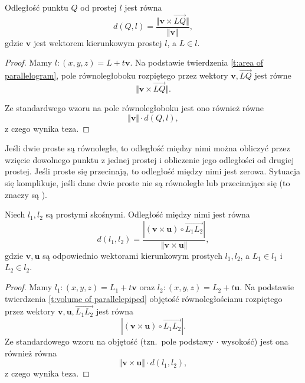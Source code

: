 \begin{theorem}
    Odległość punktu $Q$ od prostej $l$ jest równa
    \[ d(Q, l) = \frac{\Vert \mathbf{v} \times \overrightarrow{LQ}\Vert}{\Vert\mathbf{v}\Vert}, \]
    gdzie $\mathbf{v}$ jest wektorem kierunkowym prostej $l$, a $L \in l$.
\end{theorem}
\begin{proof}
    Mamy $l : (x, y, z) = L + t\mathbf{v}$. Na podstawie twierdzenia \ref{t:area of parallelogram}, pole równoległoboku rozpiętego przez wektory $\mathbf{v}, \overrightarrow{LQ}$ jest równe
    \[ \Vert \mathbf{v} \times \overrightarrow{LQ} \Vert. \]
    \begin{center}
    \end{center}
    Ze standardwego wzoru na pole równoległoboku jest ono również równe
    \[ \Vert \mathbf{v} \Vert \cdot d(Q, l), \]
    z czego wynika teza.
\end{proof}

Jeśli dwie proste są równoległe, to odległość między nimi można obliczyć przez wzięcie dowolnego punktu z jednej prostej i obliczenie jego odległości od drugiej prostej. Jeśli proste się przecinają, to odległość między nimi jest zerowa. Sytuacja się komplikuje, jeśli dane dwie proste nie są równoległe lub przecinające się (to znaczy są ).

\begin{theorem}
    \label{t:distance between lines}
    Niech $l_1, l_2$ są prostymi skośnymi. Odległość między nimi jest równa
    \[ d(l_1, l_2) = \frac{|(\mathbf{v} \times \mathbf{u}) \circ \overrightarrow{L_1L_2}|}{\Vert\mathbf{v}\times\mathbf{u}\Vert}, \]
    gdzie $\mathbf{v}, \mathbf{u}$ są odpowiednio wektorami kierunkowym prostych $l_1, l_2$, a $L_1 \in l_1$ i $L_2 \in l_2$.
\end{theorem}
\begin{proof}
    Mamy $l_1 : (x, y, z) = L_1 + t\mathbf{v}$ oraz $l_2 : (x, y, z) = L_2 + t\mathbf{u}$. Na podstawie twierdzenia \ref{t:volume of parallelepiped} objętość równoległościanu rozpiętego przez wektory $\mathbf{v}, \mathbf{u}, \overrightarrow{L_1L_2}$ jest równa
    \[ |(\mathbf{v} \times \mathbf{u}) \circ \overrightarrow{L_1L_2}|. \]
    Ze standardowego wzoru na objętość (tzn.\ pole podstawy $\cdot$ wysokość) jest ona również równa
    \[ \Vert\mathbf{v}\times\mathbf{u}\Vert \cdot d(l_1, l_2), \]
    z czego wynika teza.
\end{proof}

